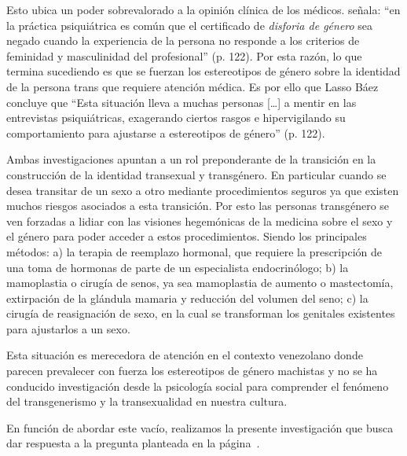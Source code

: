Esto ubica un poder sobrevalorado a la opinión clínica de los médicos.
\textcite{LassoBaez2014} señala: “en la práctica psiquiátrica es común que el
certificado de \emph{disforia de género} sea negado cuando la experiencia de la
persona no responde a los criterios de feminidad y masculinidad del profesional”
(p. 122). Por esta razón, lo que termina sucediendo es que se fuerzan los
estereotipos de género sobre la identidad de la persona trans que requiere
atención médica. Es por ello que Lasso Báez concluye que “Esta situación lleva a
muchas personas […] a mentir en las entrevistas psiquiátricas, exagerando
ciertos rasgos e hipervigilando su comportamiento para ajustarse a estereotipos
de género” (p. 122).

Ambas investigaciones apuntan a un rol preponderante de la
transición en la construcción de la identidad transexual y transgénero.
En particular cuando se desea transitar de un sexo a otro mediante
procedimientos seguros ya que existen muchos riesgos asociados a esta
transición. Por esto las personas transgénero se ven forzadas a lidiar con las
visiones hegemónicas de la medicina sobre el sexo y el género para poder acceder
a estos procedimientos. Siendo los principales métodos: a) la terapia de
reemplazo hormonal, que requiere la prescripción de una toma de hormonas de
parte de un especialista endocrinólogo; b) la mamoplastia o cirugía de senos, ya
sea mamoplastia de aumento o mastectomía, extirpación de la glándula mamaria y
reducción del volumen del seno; c) la cirugía de reasignación de sexo, en la
cual se transforman los genitales existentes para ajustarlos a un sexo.

Esta situación es merecedora de atención en el contexto venezolano donde parecen
prevalecer con fuerza los estereotipos de género machistas y no se ha conducido
investigación desde la psicología social para comprender el fenómeno del
transgenerismo y la transexualidad en nuestra cultura.

En función de abordar este vacío, realizamos la presente investigación que busca
dar respuesta a la pregunta planteada en la página~\pageref{preguntas}.


